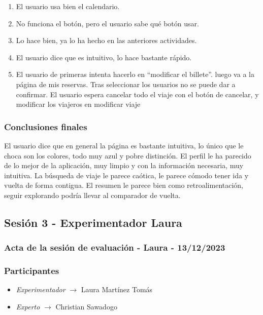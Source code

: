 \begin{enumerate}
    \item El usuario usa bien el calendario.
    \item No funciona el botón, pero el usuario sabe qué botón usar.
    \item Lo hace bien, ya lo ha hecho en las anteriores actividades.
    \item El usuario dice que es intuitivo, lo hace bastante rápido.
    \item El usuario de primeras intenta hacerlo en  “modificar el billete”. luego va a la página de mis reservas. Tras seleccionar los usuarios no se puede dar a confirmar. El usuario espera cancelar todo el viaje con el botón de cancelar, y modificar los viajeros en modificar viaje
\end{enumerate}


\subsubsection{Conclusiones finales}
El usuario dice que en general la página es bastante intuitiva, lo único que le choca son los colores, todo muy azul y pobre distinción. El perfil le ha parecido de 
lo mejor de la aplicación, muy limpio y con la información necesaria, muy intuitiva. La búsqueda de viaje le parece caótica, le parece cómodo tener ida y vuelta de 
forma contigua. El resumen le parece bien como retroalimentación, seguir explorando podría llevar al comparador de vuelta.

\subsection{Sesión 3 - Experimentador Laura}
\subsubsection{Acta de la sesión de evaluación - Laura - 13/12/2023}
\subsubsection{Participantes}
\begin{itemize}
    \item \textit{Experimentador} $\rightarrow$ Laura Martínez Tomás
    \item \textit{Experto} $\rightarrow$ Christian Sawadogo
\end{itemize}

